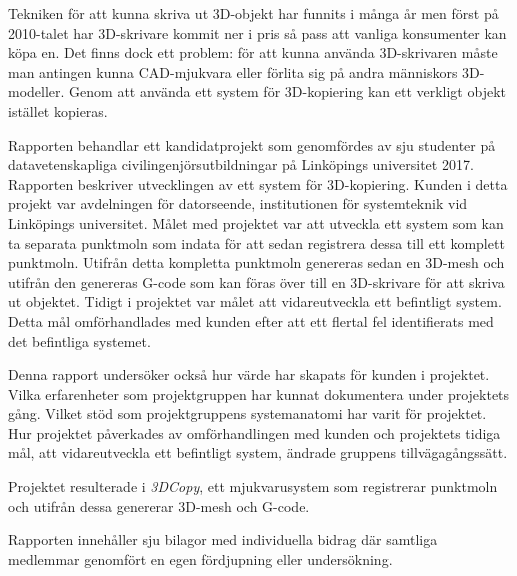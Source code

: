 Tekniken för att kunna skriva ut 3D-objekt har funnits i många år men först på 2010-talet har 3D-skrivare kommit ner i pris så pass att vanliga konsumenter kan köpa en.  Det finns dock ett problem: för att kunna använda 3D-skrivaren måste man antingen kunna CAD-mjukvara eller förlita sig på andra människors 3D-modeller. Genom att använda ett system för 3D-kopiering kan ett verkligt objekt istället kopieras.

Rapporten behandlar ett kandidatprojekt som genomfördes av sju studenter på datavetenskapliga civilingenjörsutbildningar på Linköpings universitet 2017. Rapporten beskriver utvecklingen av ett system för 3D-kopiering. Kunden i detta projekt var avdelningen för datorseende, institutionen för systemteknik vid Linköpings universitet. Målet med projektet var att utveckla ett system som kan ta separata punktmoln som indata för att sedan registrera dessa till ett komplett punktmoln. Utifrån detta kompletta punktmoln genereras sedan en 3D-mesh och utifrån den genereras G-code som kan föras över till en 3D-skrivare för att skriva ut objektet.
Tidigt i projektet var målet att vidareutveckla ett befintligt system. Detta mål omförhandlades med kunden efter att ett flertal fel identifierats med det befintliga systemet. 

Denna rapport undersöker också hur värde har skapats för kunden i projektet. Vilka erfarenheter som projektgruppen har kunnat dokumentera under projektets gång. Vilket stöd som projektgruppens systemanatomi har varit för projektet. Hur projektet påverkades av omförhandlingen med kunden och projektets tidiga mål, att vidareutveckla ett befintligt system, ändrade gruppens tillvägagångssätt.

Projektet resulterade i \textit{3DCopy}, ett mjukvarusystem som registrerar punktmoln och utifrån dessa genererar 3D-mesh och G-code.

Rapporten innehåller sju bilagor med individuella bidrag där samtliga medlemmar genomfört en egen fördjupning eller undersökning. 

